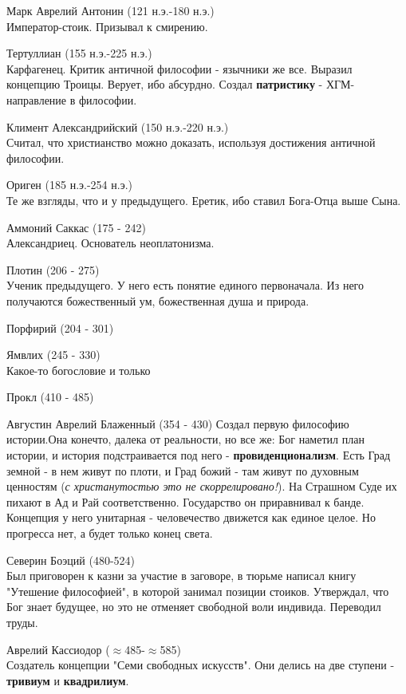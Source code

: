 \documentclass[12pt,a4paper]{article}
\begin{document}
Марк Аврелий Антонин (121 н.э.-180 н.э.)\\
Император-стоик. Призывал к смирению.

Тертуллиан (155 н.э.-225 н.э.)\\
Карфагенец. Критик античной философии - язычники же все. Выразил концепцию Троицы. Верует, ибо абсурдно. Создал \textbf{патристику} - ХГМ-направление в философии.

Климент Александрийский (150 н.э.-220 н.э.)\\
Считал, что христианство можно доказать, используя достижения античной философии.

Ориген (185 н.э.-254 н.э.)\\
Те же взгляды, что и у предыдущего. Еретик, ибо ставил Бога-Отца выше Сына.

Аммоний Саккас (175 - 242)\\
Александриец. Основатель неоплатонизма.

Плотин (206 - 275)\\
Ученик предыдущего. У него есть понятие единого первоначала. Из него получаются божественный ум, божественная душа и природа.

Порфирий (204 - 301)

Ямвлих (245 - 330)\\
Какое-то богословие и только

Прокл (410 - 485)

Августин Аврелий Блаженный (354 - 430)
Создал первую философию истории.Она конечто, далека от реальности, но все же: Бог наметил план истории, и история подстраивается под него - \textbf{провиденционализм}. Есть Град земной - в нем живут по плоти, и Град божий - там живут по духовным ценностям (\textit{с христанутостью это не скоррелировано!}). На Страшном Суде их пихают в Ад и Рай соответственно. Государство он приравнивал к банде. Концепция у него унитарная - человечество движется как единое целое. Но прогресса нет, а будет только конец света.

Северин Боэций (480-524)\\
Был приговорен к казни за участие в заговоре, в тюрьме написал книгу "Утешение философией", в которой занимал позиции стоиков. Утверждал, что Бог знает будущее, но это не отменяет свободной воли индивида. Переводил труды.

Аврелий Кассиодор ($\approx$485-$\approx$585)\\
Создатель концепции "Семи свободных искусств". Они делись на две ступени - \textbf{тривиум} и \textbf{квадрилиум}.
\end{document}
